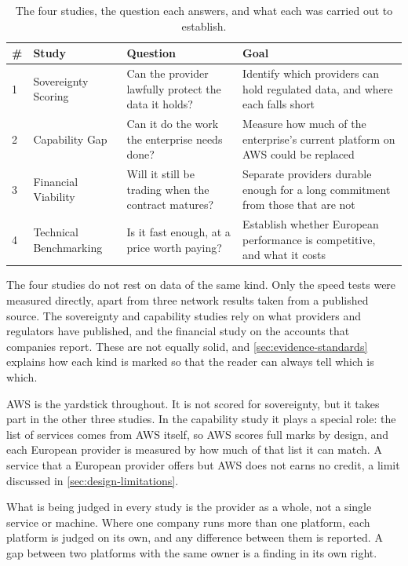 \begin{table}[htbp]
  \centering
  \caption{The four studies, the question each answers, and what each was
           carried out to establish.}
  \label{tab:study-overview}
  \small
  \begin{tabularx}{\textwidth}{@{}l l X X@{}}
    \toprule
    \textbf{\#} & \textbf{Study} & \textbf{Question} & \textbf{Goal} \\
    \midrule
    1 & Sovereignty Scoring
      & Can the provider lawfully protect the data it holds?
      & Identify which providers can hold regulated data, and where each falls
        short \\[0.3em]
    2 & Capability Gap
      & Can it do the work the enterprise needs done?
      & Measure how much of the enterprise's current platform on AWS could be replaced
        \\[0.3em]
    3 & Financial Viability
      & Will it still be trading when the contract matures?
      & Separate providers durable enough for a long commitment from those that
        are not \\[0.3em]
    4 & Technical Benchmarking
      & Is it fast enough, at a price worth paying?
      & Establish whether European performance is competitive, and what it costs
        \\
    \bottomrule
  \end{tabularx}
\end{table}

The four studies do not rest on data of the same kind. Only the speed tests were
measured directly, apart from three network results taken from a published source.
The sovereignty and capability studies rely on what providers and regulators have
published, and the financial study on the accounts that companies report. These are
not equally solid, and \cref{sec:evidence-standards} explains how each kind is
marked so that the reader can always tell which is which.

\acs{AWS} is the yardstick throughout. It is not scored for sovereignty, but it
takes part in the other three studies. In the capability study it plays a special
role: the list of services comes from \acs{AWS} itself, so \acs{AWS} scores full
marks by design, and each European provider is measured by how much of that list it
can match. A service that a European provider offers but \acs{AWS} does not earns
no credit, a limit discussed in \cref{sec:design-limitations}.

What is being judged in every study is the provider as a whole, not a single
service or machine. Where one company runs more than one platform, each platform is
judged on its own, and any difference between them is reported. A gap between two
platforms with the same owner is a finding in its own right.

